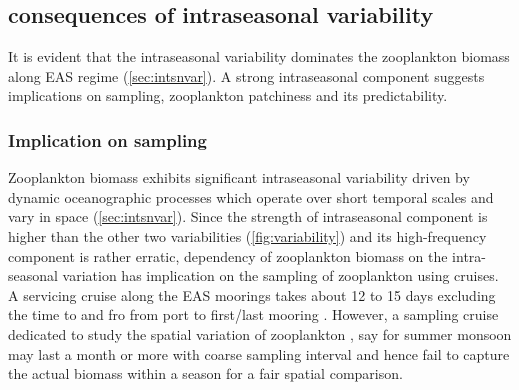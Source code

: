 \documentclass[authoryear,review,12pt]{elsarticle}
\begin{document}
 	\subsection{consequences of intraseasonal variability}
	It is evident that the intraseasonal variability dominates the zooplankton biomass along EAS regime (\cref{sec:intsnvar}). A strong intraseasonal component suggests implications on sampling, zooplankton patchiness and its predictability. 
 
    \subsubsection{Implication on sampling}  
    \label{sec:samplingimplication}
    Zooplankton biomass exhibits significant intraseasonal variability driven by dynamic oceanographic processes which operate over short temporal scales and vary in space (\cref{sec:intsnvar}). Since the strength of intraseasonal component is higher than the other two variabilities (\cref{fig:variability}) and its high-frequency component is rather erratic, dependency of zooplankton biomass on the intra-seasonal variation has implication on the sampling of zooplankton using cruises. A servicing cruise along the EAS moorings takes about 12 to 15 days excluding the time to and fro from port to first/last mooring \citep{ chaudhuri2020observed, aparna2022seasonal}. However, a sampling cruise dedicated to study the spatial variation of zooplankton \citep{madhupratap1992zooplankton,smith1998seasonal,wishner1998mesozooplankton, kidwai2000dd}, say for summer monsoon may last a month or more with coarse sampling interval and hence fail to capture the actual biomass within a season for a fair spatial comparison. 
    
\end{document}
